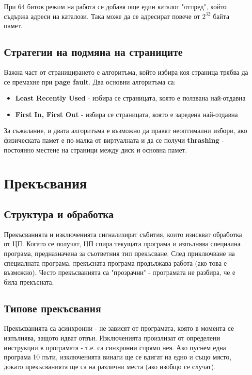 \documentclass[fleqn,12pt]{article}
\begin{document}
При 64 битов режим на работа се добавя още един каталог "отпред", който съдържа адреси на каталози. Така може да се адресират 
повече от $2^32$ байта памет.

\subsection{Стратегии на подмяна на страниците}
Важна част от страницирането е алгоритъма, който избира коя страница трябва да се премахне при \textbf{page fault}.
Два основни алгоритъма са:
\begin{itemize}
    \item \textbf{Least Recently Used} - избира се страницата, която е ползвана най-отдавна
    \item \textbf{First In, First Out} - избира се страницата, която е заредена най-отдавна
\end{itemize}

За съжалание, и двата алгоритъма е възможно да правят неоптимални избори, ако физическата памет е по-малка от виртуалната 
и да се получи \textbf{thrashing} - постоянно местене на страници между диск и основна памет.

\section{Прекъсвания}

\subsection{Структура и обработка}
Прекъсванията и изключенията сигнализират събития, които изискват обработка от ЦП. Когато се получат,
ЦП спира текущата програма и изпълнява специална програма, предназначена за съответния тип прекъсване.
След приключване на специалната програма, прекъсната програма продължава работа (ако това е възможно).
Често прекъсванията са "прозрачни" - програмата не разбира, че е била прекъсната.

\subsection{Типове прекъсвания}
Прекъсванията са асинхронни - не зависят от програмата, която в момента се изпълнява, защото идват отвън.
Изключенията произлизат от определени инструкции в програмата - т.е. са синхронни спрямо нея.
Ако пуснем една програма 10 пъти, изключенията винаги ще се вдигат на едно и също място, докато прекъсванията
ще са на различни места (ако изобщо се случат).
\end{document}
